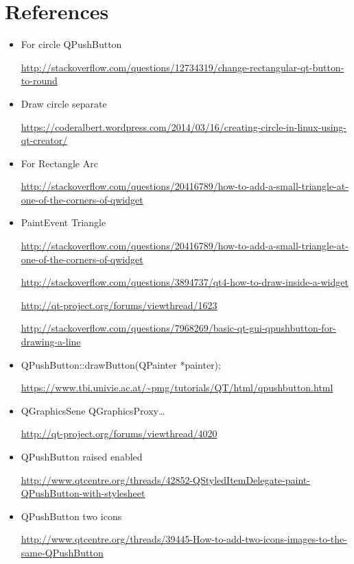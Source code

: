 \documentclass[9pt,b5paper]{article}
\begin{document}
\section{References}
\label{sec-9}

\begin{itemize}
\item For circle QPushButton

\url{http://stackoverflow.com/questions/12734319/change-rectangular-qt-button-to-round}

\item Draw circle separate

\url{https://coderalbert.wordpress.com/2014/03/16/creating-circle-in-linux-using-qt-creator/}

\item For Rectangle Arc

\url{http://stackoverflow.com/questions/20416789/how-to-add-a-small-triangle-at-one-of-the-corners-of-qwidget}

\item PaintEvent Triangle

\url{http://stackoverflow.com/questions/20416789/how-to-add-a-small-triangle-at-one-of-the-corners-of-qwidget}

\url{http://stackoverflow.com/questions/3894737/qt4-how-to-draw-inside-a-widget}

\url{http://qt-project.org/forums/viewthread/1623}

\url{http://stackoverflow.com/questions/7968269/basic-qt-gui-qpushbutton-for-drawing-a-line}

\item QPushButton::drawButton(QPainter *painter);

\url{https://www.tbi.univie.ac.at/~pmg/tutorials/QT/html/qpushbutton.html}

\item QGraphicsSene QGraphicsProxy\ldots{}

\url{http://qt-project.org/forums/viewthread/4020}

\item QPushButton raised enabled

\url{http://www.qtcentre.org/threads/42852-QStyledItemDelegate-paint-QPushButton-with-stylesheet}

\item QPushButton two icons

\url{http://www.qtcentre.org/threads/39445-How-to-add-two-icons-images-to-the-same-QPushButton}


\end{itemize}
\end{document}
